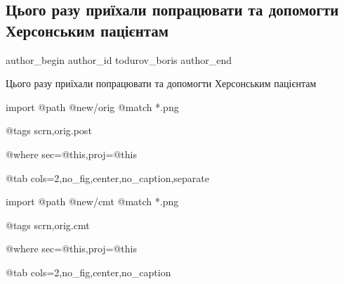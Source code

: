  
 
 
 
 
 
\subsection{Цього разу приїхали попрацювати та допомогти Херсонським пацієнтам}
\label{sec:18_12_2022.fb.todurov_boris.1.herson}
 
\ifcmt
 author_begin
   author_id todurov_boris
 author_end
\fi

Цього разу приїхали попрацювати та допомогти Херсонським пацієнтам

\qqSecOrig

\ifcmt
  import
    @path @new/orig
    @match *.png

    @tags scrn,orig.post

    @where sec=@this,proj=@this
  
    @tab cols=2,no_fig,center,no_caption,separate
\fi

\qqSecCmtScr

\ifcmt
  import
    @path @new/cmt
    @match *.png

    @tags scrn,orig.cmt

    @where sec=@this,proj=@this
  
    @tab cols=2,no_fig,center,no_caption
\fi
